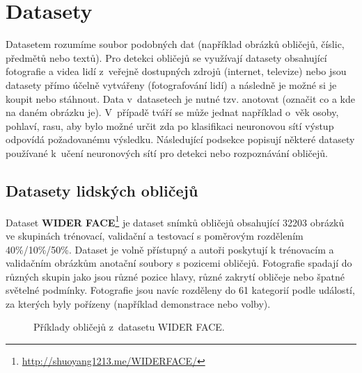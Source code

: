 \section{Datasety}
\label{sekce:datasety}
Datasetem rozumíme soubor podobných dat (například obrázků obličejů, číslic, předmětů nebo textů). Pro detekci obličejů se využívají datasety obsahující fotografie a videa lidí z~veřejně dostupných zdrojů (internet, televize) nebo jsou datasety přímo účelně vytvářeny (fotografování lidí) a následně je možné si je koupit nebo stáhnout. Data v~datasetech je nutné tzv. anotovat (označit co a kde na daném obrázku je). V~případě tváří se může jednat například o~věk osoby, pohlaví, rasu, aby bylo možné určit zda po klasifikaci neuronovou sítí výstup odpovídá požadovanému výsledku. Následující podsekce popisují některé datasety používané k~učení neuronových sítí pro detekci nebo rozpoznávání obličejů.

\subsection*{Datasety lidských obličejů}
Dataset \textbf{WIDER FACE}\footnote{\url{http://shuoyang1213.me/WIDERFACE/}} je dataset snímků obličejů obsahující 32203 obrázků ve skupinách trénovací, validační a testovací s poměrovým rozdělením 40\%/10\%/50\%. Dataset je volně přístupný a autoři poskytují k trénovacím a validačním obrázkům anotační soubory s pozicemi obličejů. Fotografie spadají do různých skupin jako jsou různé pozice hlavy, různé zakrytí obličeje nebo špatné světelné podmínky. Fotografie jsou navíc rozděleny do 61 kategorií podle událostí, za kterých byly pořízeny (například demonstrace nebo volby).

\begin{figure}[H]
  \begin{center}
  \label{obrazek:celeba}
  \caption{Příklady obličejů z~datasetu WIDER FACE.}
  \end{center}
\end{figure}

